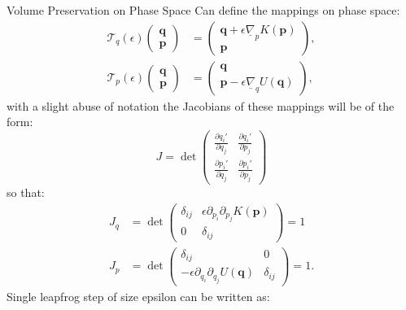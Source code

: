 \documentclass{beamer}
\begin{document}
\begin{frame}[t,allowframebreaks]{Volume Preservation on Phase Space}
Can define the mappings on phase space:
\begin{align*}
                \label{eq:psMap1}
                \mathcal{T}_q\left(\epsilon\right)\begin{pmatrix} \bm{q} \\ \bm{p} \end{pmatrix} & = \begin{pmatrix} \bm{q} +\epsilon \underline{\nabla}_pK\left(\bm{p}\right) \\ \bm{p} \end{pmatrix}, \\
                \label{eq:psMap2}
                \mathcal{T}_p\left(\epsilon\right)\begin{pmatrix} \bm{q} \\ \bm{p} \end{pmatrix} & = \begin{pmatrix} \bm{q} \\ \bm{p} - \epsilon \underline{\nabla}_qU\left(\bm{q}\right) \end{pmatrix},
            \end{align*}
            with a slight abuse of notation the Jacobians of these mappings will be of the form:
            \begin{equation*}
                J = \det\begin{pmatrix}\frac{\partial q_i'}{\partial q_j} & \frac{\partial q_i'}{\partial p_j} \\ \frac{\partial p_i'}{\partial q_j} & \frac{\partial p_i'}{\partial p_j} \end{pmatrix}
            \end{equation*}
            so that:
            \begin{align*}
            J_q& =\det\begin{pmatrix} \delta_{ij} & \epsilon\partial_{p_i}\partial_{p_j}K\left(\bm{p}\right) \\ 0 & \delta_{ij} \end{pmatrix} = 1 \\
            J_p& =\det\begin{pmatrix} \delta_{ij} &  0  \\ -\epsilon\partial_{q_i}\partial_{q_j}U\left(\bm{q}\right) & \delta_{ij} \end{pmatrix} = 1.
            \end{align*}
            Single leapfrog step of size epsilon can be written as:

\end{frame}
\end{document}
